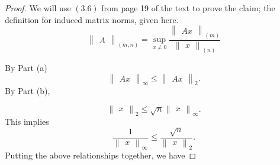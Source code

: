\documentclass{article}
\begin{document}
\begin{proof}
    We will use $(3.6)$ from page 19 of the text to prove the claim; the definition for induced matrix norms, given here.
    \[ 
    \begin{Vmatrix}
        A
    \end{Vmatrix}_{(m, n)}
    =
    \sup_{x \neq 0}
    \frac{
    \begin{Vmatrix}
        Ax
    \end{Vmatrix}_{(m)}   
    }{
    \begin{Vmatrix}
        x
    \end{Vmatrix}_{(n)} 
    } 
    \]
    
    By Part (a) 
    \[
    \begin{Vmatrix}
        Ax
    \end{Vmatrix}_{\infty}
    \leq
    \begin{Vmatrix}
        Ax
    \end{Vmatrix}_{2}.
    \]
    By Part (b),

    \[
    \begin{Vmatrix}
        x
    \end{Vmatrix}_{2}
    \leq
    \sqrt{n}
    \begin{Vmatrix}
        x
    \end{Vmatrix}_{\infty}. 
    \]
    This implies 
    \[
    \frac{
        1
    }{
        \begin{Vmatrix}
            x
        \end{Vmatrix}_{\infty}
    } 
    \leq 
    \frac{
        \sqrt{n}
    }{
        \begin{Vmatrix}
            x
        \end{Vmatrix}_{2}
    }.
    \]
    Putting the above relationships together, we have 
    

\end{proof}
\end{document}
